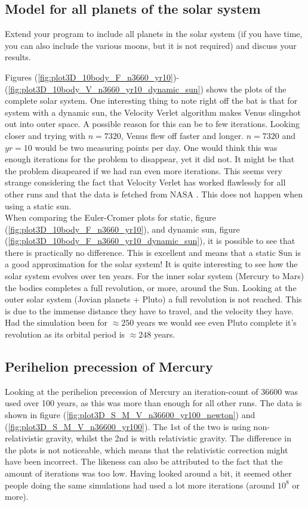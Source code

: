 \documentclass{article}
\begin{document}
\subsection{Model for all planets of the solar system}      \label{sec:tenbody}

    Extend your program to include all planets in the solar system (if you
    have time, you can also include the various moons, but it is not required) and
    discuss your results.

    Figures (\ref{fig:plot3D_10body_F_n3660_yr10})-(\ref{fig:plot3D_10body_V_n3660_yr10_dynamic_sun}) shows the plots of the complete solar system. One interesting thing to note right off the bat is that for system with a dynamic sun, the Velocity Verlet algorithm makes Venus slingshot out into outer space. A possible reason for this can be to few iterations. Looking closer and trying with $n=7320$, Venus flew off faster and longer. $n=7320$ and $yr=10$ would be two measuring points per day. One would think this was enough iterations for the problem to disappear, yet it did not. It might be that the problem disapeared if we had ran even more iterations. This seems very strange considering the fact that Velocity Verlet has worked flawlessly for all other runs and that the data is fetched from NASA \cite{solarsystemdata}. This does not happen when using a static sun.\\

    When comparing the Euler-Cromer plots for static, figure (\ref{fig:plot3D_10body_F_n3660_yr10}), and dynamic sun, figure (\ref{fig:plot3D_10body_F_n3660_yr10_dynamic_sun}), it is possible to see that there is practically no difference. This is excellent and means that a static Sun is a good approximation for the solar system! It is quite interesting to see how the solar system evolves over ten years. For the inner solar system (Mercury to Mars) the bodies completes a full revolution, or more, around the Sun. Looking at the outer solar system (Jovian planets + Pluto) a full revolution is not reached. This is due to the immense distance they have to travel, and the velocity they have. Had the simulation been for $\approx250$ years we would see even Pluto complete it's revolution as its orbital period is $\approx 248$ years.

\subsection{Perihelion precession of Mercury}

    Looking at the perihelion precession of Mercury an iteration-count of 36600 was used over 100 years, as this was more than enough for all other runs. The data is shown in figure (\ref{fig:plot3D_S_M_V_n36600_yr100_newton}) and (\ref{fig:plot3D_S_M_V_n36600_yr100}). The 1st of the two is using non-relativistic gravity, whilst the 2nd is with relativistic gravity. The difference in the plots is not noticeable, which means that the relativistic correction might have been incorrect. The likeness can also be attributed to the fact that the amount of iterations was too low. Having looked around a bit, it seemed other people doing the same simulations had used a lot more iterations (around $10^8$ or more).\\
\end{document}
